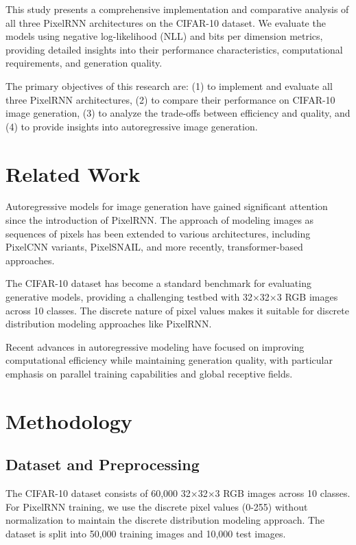 \documentclass[norunningheads]{llncs}
\begin{document}
This study presents a comprehensive implementation and comparative analysis of all three PixelRNN architectures on the CIFAR-10 dataset. We evaluate the models using negative log-likelihood (NLL) and bits per dimension metrics, providing detailed insights into their performance characteristics, computational requirements, and generation quality.

The primary objectives of this research are: (1) to implement and evaluate all three PixelRNN architectures, (2) to compare their performance on CIFAR-10 image generation, (3) to analyze the trade-offs between efficiency and quality, and (4) to provide insights into autoregressive image generation.

\section{Related Work}

Autoregressive models for image generation have gained significant attention since the introduction of PixelRNN. The approach of modeling images as sequences of pixels has been extended to various architectures, including PixelCNN variants, PixelSNAIL, and more recently, transformer-based approaches.

The CIFAR-10 dataset has become a standard benchmark for evaluating generative models, providing a challenging testbed with 32×32×3 RGB images across 10 classes. The discrete nature of pixel values makes it suitable for discrete distribution modeling approaches like PixelRNN.

Recent advances in autoregressive modeling have focused on improving computational efficiency while maintaining generation quality, with particular emphasis on parallel training capabilities and global receptive fields.

\section{Methodology}

\subsection{Dataset and Preprocessing}

The CIFAR-10 dataset consists of 60,000 32×32×3 RGB images across 10 classes. For PixelRNN training, we use the discrete pixel values (0-255) without normalization to maintain the discrete distribution modeling approach. The dataset is split into 50,000 training images and 10,000 test images.
\end{document}
